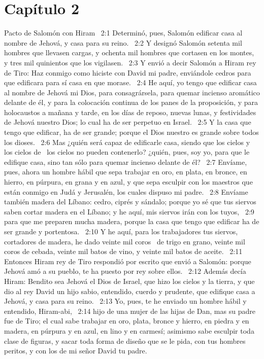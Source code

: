 	\section*{Capítulo 2}
Pacto de Salomón con Hiram   
2:1 Determinó, pues, Salomón edificar casa al nombre de Jehová, y casa para su reino.  
2:2 Y designó Salomón setenta mil hombres que llevasen cargas, y ochenta mil hombres que cortasen en los montes, y tres mil quinientos que los vigilasen.  
2:3 Y envió a decir Salomón a Hiram rey de Tiro: Haz conmigo como hiciste con David mi padre, enviándole cedros para que edificara para sí casa en que morase.  
		2:4 He aquí, yo tengo que edificar casa al nombre de Jehová mi Dios, para consagrársela, para quemar incienso aromático delante de él, y para la colocación continua de los panes de la proposición, y para holocaustos a mañana y tarde, en los días de reposo, nuevas lunas, y festividades de Jehová nuestro Dios; lo cual ha de ser perpetuo en Israel.  
		2:5 Y la casa que tengo que edificar, ha de ser grande; porque el Dios nuestro es grande sobre todos los dioses.  
		2:6 Mas ¿quién será capaz de edificarle casa, siendo que los cielos y los cielos de  los cielos no pueden contenerlo? ¿quién, pues, soy yo, para que le edifique casa, sino tan sólo para quemar incienso delante de él?  
		2:7 Envíame, pues, ahora un hombre hábil que sepa trabajar en oro, en plata, en bronce, en hierro, en púrpura, en grana y en azul, y que sepa esculpir con los maestros que están conmigo en Judá y Jerusalén, los cuales dispuso mi padre.  
		2:8 Envíame también madera del Líbano: cedro, ciprés y sándalo; porque yo sé que tus siervos saben cortar madera en el Líbano; y he aquí, mis siervos irán con los tuyos,  
		2:9 para que me preparen mucha madera, porque la casa que tengo que edificar ha de ser grande y portentosa.  
		2:10 Y he aquí, para los trabajadores tus siervos, cortadores de madera, he dado veinte mil coros  de trigo en grano, veinte mil coros de cebada, veinte mil batos de vino, y veinte mil batos de aceite.  
		2:11 Entonces Hiram rey de Tiro respondió por escrito que envió a Salomón: porque Jehová amó a su pueblo, te ha puesto por rey sobre ellos.  
		2:12 Además decía Hiram: Bendito sea Jehová el Dios de Israel, que hizo los cielos y la tierra, y que dio al rey David un hijo sabio, entendido, cuerdo y prudente, que edifique casa a Jehová, y casa para su reino.  
		2:13 Yo, pues, te he enviado un hombre hábil y entendido, Hiram-abi,  
		2:14 hijo de una mujer de las hijas de Dan, mas su padre fue de Tiro; el cual sabe trabajar en oro, plata, bronce y hierro, en piedra y en madera, en púrpura y en azul, en lino y en carmesí; asimismo sabe esculpir toda clase de figuras, y sacar toda forma de diseño que se le pida, con tus hombres peritos, y con los de mi señor David tu padre.  
